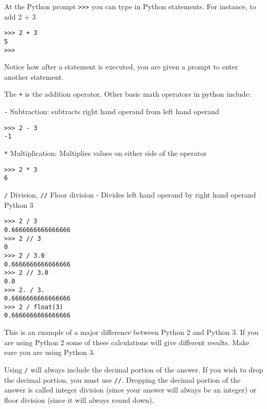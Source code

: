 \documentclass[12pt]{article}
\begin{document}
At the Python prompt \texttt{>>>} you can type in Python statements. For instance, to add 2 + 3 
\begin{lstlisting}[style=bash]
>>> 2 + 3
5
>>>
\end{lstlisting}

Notice how after a statement is executed, you are given a prompt to enter another statement.

The \texttt{+} is the addition operator. Other basic math operators in python include:

\texttt{-} Subtraction: subtracts right hand operand from left hand operand

\begin{lstlisting}[style=bash]
>>> 2 - 3
-1
\end{lstlisting}

\texttt{*} Multiplication: Multiplies values on either side of the operator

\begin{lstlisting}[style=bash]
>>> 2 * 3
6
\end{lstlisting}


\texttt{/} Division, \texttt{//} Floor division - Divides left hand operand by right hand operand
\\

Python 3
\begin{lstlisting}[style=bash]
>>> 2 / 3
0.6666666666666666
>>> 2 // 3
0
>>> 2 / 3.0
0.6666666666666666
>>> 2 // 3.0
0.0
>>> 2. / 3.
0.6666666666666666
>>> 2 / float(3)
0.6666666666666666
\end{lstlisting}

This is an example of a major difference between Python 2 and Python 3. If you are using Python 2 some of these calculations will give different results. Make sure you are using Python 3.

Using \texttt{/} will always include the decimal portion of the answer. If you wish to drop the decimal portion, you must use \texttt{//}. Dropping the decimal portion of the answer is called integer division (since your answer will always be an integer) or floor division (since it will always round down).

\end{document}
